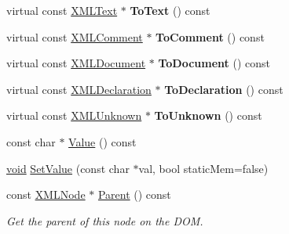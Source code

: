 \begin{DoxyCompactItemize}
\item 
\mbox{\label{classtinyxml2_1_1_x_m_l_node_acb9ccc1beda27c0efcb0545683c3e7f4}} 
virtual const \hyperlink{classtinyxml2_1_1_x_m_l_text}{X\+M\+L\+Text} $\ast$ {\bfseries To\+Text} () const
\item 
\mbox{\label{classtinyxml2_1_1_x_m_l_node_a6a53bb83faf5c0ccc95b6cf74dba0025}} 
virtual const \hyperlink{classtinyxml2_1_1_x_m_l_comment}{X\+M\+L\+Comment} $\ast$ {\bfseries To\+Comment} () const
\item 
\mbox{\label{classtinyxml2_1_1_x_m_l_node_ae8a5250331a5f12e10843fcb5ef3ef0b}} 
virtual const \hyperlink{classtinyxml2_1_1_x_m_l_document}{X\+M\+L\+Document} $\ast$ {\bfseries To\+Document} () const
\item 
\mbox{\label{classtinyxml2_1_1_x_m_l_node_ac48bb4bf9eb7bb3654ad4b94945db9a1}} 
virtual const \hyperlink{classtinyxml2_1_1_x_m_l_declaration}{X\+M\+L\+Declaration} $\ast$ {\bfseries To\+Declaration} () const
\item 
\mbox{\label{classtinyxml2_1_1_x_m_l_node_af29ffd6cbe609b6fa04a705256150408}} 
virtual const \hyperlink{classtinyxml2_1_1_x_m_l_unknown}{X\+M\+L\+Unknown} $\ast$ {\bfseries To\+Unknown} () const
\item 
const char $\ast$ \hyperlink{classtinyxml2_1_1_x_m_l_node_a0485e51c670e741884cfd8362274d680}{Value} () const
\item 
\hyperlink{interfacevoid}{void} \hyperlink{classtinyxml2_1_1_x_m_l_node_a09dd68cf9eae137579f6e50f36487513}{Set\+Value} (const char $\ast$val, bool static\+Mem=false)
\item 
\mbox{\label{classtinyxml2_1_1_x_m_l_node_ae0f62bc186c56c2e0483ebd52dbfbe34}} 
const \hyperlink{classtinyxml2_1_1_x_m_l_node}{X\+M\+L\+Node} $\ast$ \hyperlink{classtinyxml2_1_1_x_m_l_node_ae0f62bc186c56c2e0483ebd52dbfbe34}{Parent} () const
\begin{DoxyCompactList}\small\item\em Get the parent of this node on the D\+OM. \end{DoxyCompactList}\item 
\mbox{\label{classtinyxml2_1_1_x_m_l_node_a76029693a5a54fbb721a41d7a0ca8a97}} 

\end{DoxyCompactItemize}

